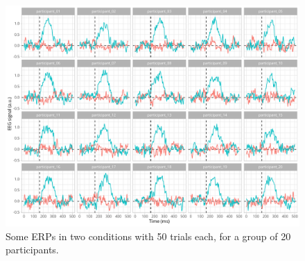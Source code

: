 \documentclass[
  doc,
  floatsintext,
  longtable,
  a4paper,
  nolmodern,
  notxfonts,
  notimes,
  colorlinks=true,linkcolor=blue,citecolor=blue,urlcolor=blue]{apa7}
\begin{document}
\begin{figure}[H]

\caption{Some ERPs in two conditions with 50 trials each, for a group of
20 participants.}

{\centering \includegraphics[width=1\textwidth,height=\textheight]{brms_meeg_files/figure-pdf/eeg-group-1.pdf}

}

\end{figure}%
\end{document}
